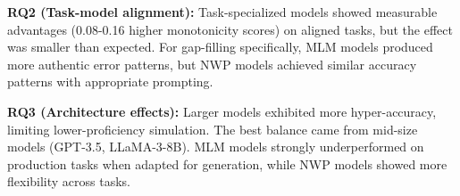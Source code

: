 \textbf{RQ2 (Task-model alignment):} Task-specialized models showed measurable advantages (0.08-0.16 higher monotonicity scores) on aligned tasks, but the effect was smaller than expected. For gap-filling specifically, MLM models produced more authentic error patterns, but NWP models achieved similar accuracy patterns with appropriate prompting.

\textbf{RQ3 (Architecture effects):} Larger models exhibited more hyper-accuracy, limiting lower-proficiency simulation. The best balance came from mid-size models (GPT-3.5, LLaMA-3-8B). MLM models strongly underperformed on production tasks when adapted for generation, while NWP models showed more flexibility across tasks.
